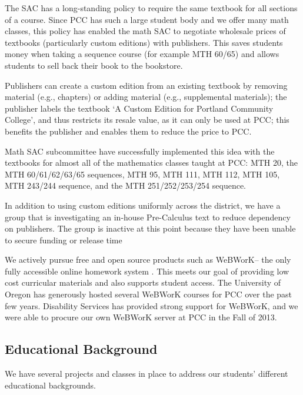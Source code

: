 The SAC has a long-standing policy to require the same textbook for all sections of a course. Since PCC has such a large student body and we offer many math classes, this policy has enabled the math SAC to negotiate wholesale prices of textbooks (particularly custom editions) with publishers.  This saves students money when taking a sequence course (for example MTH 60/65) and allows students to sell back their book to the bookstore.

Publishers can create a custom edition from an existing textbook by removing material (e.g., chapters) or adding material (e.g., supplemental materials); the publisher labels the textbook `A Custom Edition for Portland Community College', and thus restricts its resale value, as it can only be used at PCC; this benefits the publisher and enables them to reduce the price to PCC.  

Math SAC subcommittee have successfully implemented this idea with the textbooks for almost all of the mathematics classes taught at PCC: MTH 20, the MTH 60/61/62/63/65 sequences, MTH 95, MTH 111, MTH 112, MTH 105, MTH 243/244 sequence, and the MTH 251/252/253/254 sequence.

In addition to using custom editions uniformly across the district, we have a group that is investigating an in-house Pre-Calculus text to reduce dependency on publishers. The group is inactive at this point because they have been unable to secure funding or release time 

We actively pursue free and open source products such as WeBWorK-- the only fully accessible online homework system . This meets our goal of providing low cost curricular materials and also supports student access. The University of Oregon has generously hosted several WeBWorK courses for PCC over the past few years.  Disability Services has provided strong support for WeBWorK, and we were able to procure our own WeBWorK server at PCC in the Fall of 2013.

\subsection{Educational Background}
We have several projects and classes in place to address our students' different educational backgrounds. 

